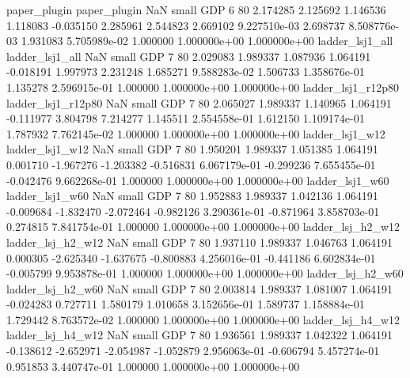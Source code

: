             paper_plugin             paper_plugin                   NaN      small      GDP                 6 80 2.174285       2.125692 1.146536       1.118083   -0.035150      2.285961      2.544823     2.669102   9.227510e-03  2.698737 8.508776e-03     1.931083   5.705989e-02            1.000000    1.000000e+00        1.000000e+00
         ladder_lsj1_all          ladder_lsj1_all                   NaN      small      GDP                 7 80 2.029083       1.989337 1.087936       1.064191   -0.018191      1.997973      2.231248     1.685271   9.588283e-02  1.506733 1.358676e-01     1.135278   2.596915e-01            1.000000    1.000000e+00        1.000000e+00
      ladder_lsj1_r12p80       ladder_lsj1_r12p80                   NaN      small      GDP                 7 80 2.065027       1.989337 1.140965       1.064191   -0.111977      3.804798      7.214277     1.145511   2.554558e-01  1.612150 1.109174e-01     1.787932   7.762145e-02            1.000000    1.000000e+00        1.000000e+00
         ladder_lsj1_w12          ladder_lsj1_w12                   NaN      small      GDP                 7 80 1.950201       1.989337 1.051385       1.064191    0.001710     -1.967276     -1.203382    -0.516831   6.067179e-01 -0.299236 7.655455e-01    -0.042476   9.662268e-01            1.000000    1.000000e+00        1.000000e+00
         ladder_lsj1_w60          ladder_lsj1_w60                   NaN      small      GDP                 7 80 1.952883       1.989337 1.042136       1.064191   -0.009684     -1.832470     -2.072464    -0.982126   3.290361e-01 -0.871964 3.858703e-01     0.274815   7.841754e-01            1.000000    1.000000e+00        1.000000e+00
       ladder_lsj_h2_w12        ladder_lsj_h2_w12                   NaN      small      GDP                 7 80 1.937110       1.989337 1.046763       1.064191    0.000305     -2.625340     -1.637675    -0.800883   4.256016e-01 -0.441186 6.602834e-01    -0.005799   9.953878e-01            1.000000    1.000000e+00        1.000000e+00
       ladder_lsj_h2_w60        ladder_lsj_h2_w60                   NaN      small      GDP                 7 80 2.003814       1.989337 1.081007       1.064191   -0.024283      0.727711      1.580179     1.010658   3.152656e-01  1.589737 1.158884e-01     1.729442   8.763572e-02            1.000000    1.000000e+00        1.000000e+00
       ladder_lsj_h4_w12        ladder_lsj_h4_w12                   NaN      small      GDP                 7 80 1.936561       1.989337 1.042322       1.064191   -0.138612     -2.652971     -2.054987    -1.052879   2.956063e-01 -0.606794 5.457274e-01     0.951853   3.440747e-01            1.000000    1.000000e+00        1.000000e+00

